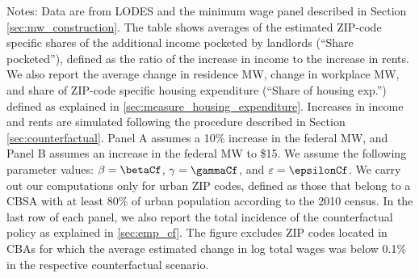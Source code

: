 \begin{table}[hbt!]
    \begin{minipage}{.95\textwidth} \footnotesize
        \vspace{2mm}
        Notes: 
        Data are from LODES and the minimum wage panel described in Section 
        \ref{sec:mw_construction}.
        The table shows averages of the estimated ZIP-code specific shares of the 
        additional income pocketed by landlords (``Share pocketed''), 
        defined as the ratio of the increase in income to the increase in rents.
        We also report the average 
        change in residence MW, change in workplace MW,
        and share of ZIP-code specific housing expenditure 
        (``Share of housing exp.'') defined as explained in \ref{sec:measure_housing_expenditure}.
        Increases in income and rents are simulated following the procedure 
        described in Section \ref{sec:counterfactual}.
        Panel A assumes a 10\% increase in the federal MW, and
        Panel B assumes an increase in the federal MW to \$15.
        We assume the following parameter values:
        $\beta = \betaCf$, $\gamma = \gammaCf$, and $\varepsilon = \epsilonCf$.
        We carry out our computations only for urban ZIP codes, defined as 
        those that belong to a CBSA with at least 80\% of urban population
        according to the 2010 census.
        In the last row of each panel, we also report the total incidence of the 
        counterfactual policy as explained in \ref{sec:emp_cf}.
        The figure excludes ZIP codes located in CBAs for which the average
        estimated change in log total wages was below 0.1\% in the respective
        counterfactual scenario.
    \end{minipage}
\end{table}

